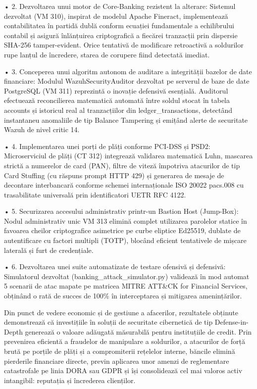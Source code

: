 • 2. Dezvoltarea unui motor de Core-Banking rezistent la alterare: Sistemul dezvoltat (VM 310), inspirat de modelul Apache Fineract, implementează contabilitatea în partidă dublă conform ecuației fundamentale a echilibrului contabil și asigură înlănțuirea criptografică a fiecărei tranzacții prin dispersie SHA-256 tamper-evident. Orice tentativă de modificare retroactivă a soldurilor rupe lanțul de încredere, starea de corupere fiind detectată imediat.

• 3. Conceperea unui algoritm autonom de auditare a integrității bazelor de date financiare: Modulul WazuhSecurityAuditor dezvoltat pe serverul de baze de date PostgreSQL (VM 311) reprezintă o inovație defensivă esențială. Auditorul efectuează reconcilierea matematică automată între soldul stocat în tabela accounts și istoricul real al tranzacțiilor din ledger\_transactions, detectând instantaneu anomaliile de tip Balance Tampering și emițând alerte de securitate Wazuh de nivel critic 14.

• 4. Implementarea unei porți de plăți conforme PCI-DSS și PSD2: Microserviciul de plăți (CT 312) integrează validarea matematică Luhn, mascarea strictă a numerelor de card (PAN), filtre de viteză împotriva atacurilor de tip Card Stuffing (cu răspuns prompt HTTP 429) și generarea de mesaje de decontare interbancară conforme schemei internaționale ISO 20022 pacs.008 cu trasabilitate universală prin identificatori UETR RFC 4122.

• 5. Securizarea accesului administrativ printr-un Bastion Host (Jump-Box): Nodul administrativ unic VM 313 elimină complet utilizarea parolelor statice în favoarea cheilor criptografice asimetrice pe curbe eliptice Ed25519, dublate de autentificare cu factori multipli (TOTP), blocând eficient tentativele de mișcare laterală și furt de credențiale.

• 6. Dezvoltarea unei suite automatizate de testare ofensivă și defensivă: Simulatorul dezvoltat (banking\_attack\_simulator.py) validează în mod automat 5 scenarii de atac mapate pe matricea MITRE ATT\&CK for Financial Services, obținând o rată de succes de 100\% în interceptarea și mitigarea amenințărilor.

Din punct de vedere economic și de gestiune a afacerilor, rezultatele obținute demonstrează că investițiile în soluții de securitate cibernetică de tip Defense-in-Depth generează o valoare adăugată măsurabilă pentru instituțiile de credit. Prin prevenirea eficientă a fraudelor de manipulare a soldurilor, a atacurilor de forță brută pe porțile de plăți și a compromiterii rețelelor interne, băncile elimină pierderile financiare directe, previn aplicarea unor amenzi de reglementare catastrofale pe linia DORA sau GDPR și își consolidează cel mai valoros activ intangibil: reputația și încrederea clienților.

